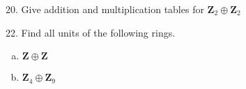 \begin{mdframed}[style=darkAnswer,frametitle={Joe Starr}]
\end{mdframed}
\newpage
\begin{mdframed}[style=darkQuesion]
  20. Give addition and multiplication tables for $\mathbf{Z}_{2} \oplus \mathbf{Z}_{2}$
\end{mdframed}
\begin{mdframed}[style=darkAnswer,frametitle={Joe Starr}]
\end{mdframed}
\newpage
\begin{mdframed}[style=darkQuesion]
  22. Find all units of the following rings.
   \begin{enumerate}[(a)]
  \item{$\mathbf{Z} \oplus \mathbf{Z}$}
  \item{$\mathbf{Z}_{4} \oplus \mathbf{Z}_{9}$}
  \end{enumerate} 
  
\end{mdframed}
\begin{mdframed}[style=darkAnswer,frametitle={Joe Starr}]
\end{mdframed}
\newpage